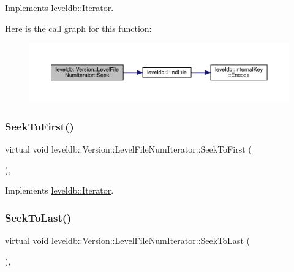 Implements \mbox{\hyperlink{classleveldb_1_1_iterator_a97a556e97ded60c677fbf4de7321ec44}{leveldb\+::\+Iterator}}.

Here is the call graph for this function\+:
\nopagebreak
\begin{figure}[H]
\begin{center}
\leavevmode
\includegraphics[width=350pt]{classleveldb_1_1_version_1_1_level_file_num_iterator_adbe855f4a783c2f578e1ff2fbb5259b2_cgraph}
\end{center}
\end{figure}
\mbox{\label{classleveldb_1_1_version_1_1_level_file_num_iterator_a8e5d34bf0c1e17e83bbb9941821a7ee2}} 
\subsubsection{\texorpdfstring{SeekToFirst()}{SeekToFirst()}}
{\footnotesize\ttfamily virtual void leveldb\+::\+Version\+::\+Level\+File\+Num\+Iterator\+::\+Seek\+To\+First (\begin{DoxyParamCaption}{ }\end{DoxyParamCaption})\hspace{0.3cm}{\ttfamily [inline]}, {\ttfamily [virtual]}}



Implements \mbox{\hyperlink{classleveldb_1_1_iterator_a3594967cf26ddf1d37c7b886bb48627e}{leveldb\+::\+Iterator}}.

\mbox{\label{classleveldb_1_1_version_1_1_level_file_num_iterator_ac7fafc33c049d1e33fdf9b5ae99f73d8}} 
\subsubsection{\texorpdfstring{SeekToLast()}{SeekToLast()}}
{\footnotesize\ttfamily virtual void leveldb\+::\+Version\+::\+Level\+File\+Num\+Iterator\+::\+Seek\+To\+Last (\begin{DoxyParamCaption}{ }\end{DoxyParamCaption})\hspace{0.3cm}{\ttfamily [inline]}, {\ttfamily [virtual]}}



